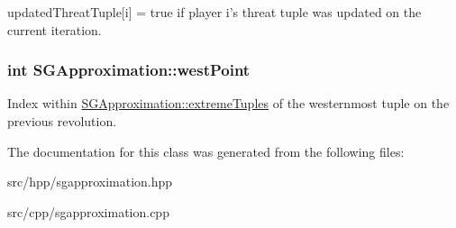 updated\+Threat\+Tuple\mbox{[}i\mbox{]} = true if player i's threat tuple was updated on the current iteration. \hypertarget{class_s_g_approximation_ad64f17c049fda984e3f4e955a372a9d6}{
\subsubsection[{west\+Point}]{\setlength{\rightskip}{0pt plus 5cm}int S\+G\+Approximation\+::west\+Point\hspace{0.3cm}{\ttfamily [private]}}}\label{class_s_g_approximation_ad64f17c049fda984e3f4e955a372a9d6}
Index within \hyperlink{class_s_g_approximation_ac55fd302328ae8fbe4d1f8cf24a7ba32}{S\+G\+Approximation\+::extreme\+Tuples} of the westernmost tuple on the previous revolution. 

The documentation for this class was generated from the following files\+:\begin{DoxyCompactItemize}
\item 
src/hpp/sgapproximation.\+hpp\item 
src/cpp/sgapproximation.\+cpp\end{DoxyCompactItemize}
